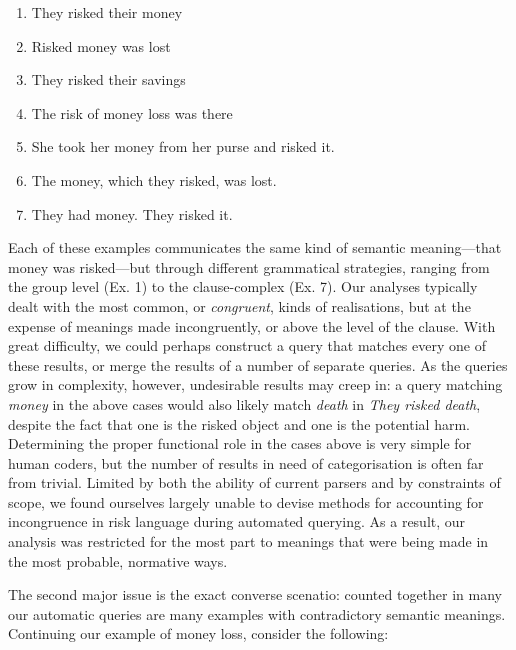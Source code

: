         \begin{enumerate} [before=\color{black}\ttfamily] \setlength\itemsep{0em} \small \setlength\itemsep{0em} \small
            \item They risked their money
            \item Risked money was lost
            \item They risked their savings
            \item The risk of money loss was there
            \item She took her money from her purse and risked it.
            \item The money, which they risked, was lost.
            \item They had money. They risked it.
        \end{enumerate}
        Each of these examples communicates the same kind of semantic meaning---that money was risked---but through different grammatical strategies, ranging from the group level (Ex. 1) to the clause-complex (Ex. 7). Our analyses typically dealt with the most common, or \emph{congruent}, kinds of realisations, but at the expense of meanings made incongruently, or above the level of the clause. With great difficulty, we could perhaps construct a query that matches every one of these results, or merge the results of a number of separate queries. As the queries grow in complexity, however, undesirable results may creep in: a query matching \emph{money} in the above cases would also likely match \emph{death} in \emph{They risked death}, despite the fact that one is the risked object and one is the potential harm. Determining the proper functional role in the cases above is very simple for human coders, but the number of results in need of categorisation is often far from trivial. Limited by both the ability of current parsers and by constraints of scope, we found ourselves largely unable to devise methods for accounting for incongruence in risk language during automated querying. As a result, our analysis was restricted for the most part to meanings that were being made in the most probable, normative ways.

        The second major issue is the exact converse scenatio: counted together in many our automatic queries are many examples with contradictory semantic meanings. Continuing our example of money loss, consider the following:

